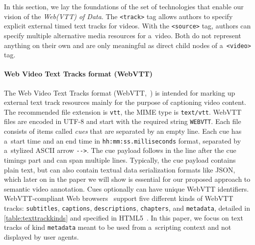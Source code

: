 \documentclass{sig-alternate}
\begin{document}
In this section, we lay the foundations of the set of technologies
that enable our vision of the \emph{Web(VTT) of Data}.
The \texttt{<track>} tag allows authors to specify explicit
external timed text tracks for videos.
With the \texttt{<source>} tag, authors can specify
multiple alternative media resources for a~video.
Both do not represent anything on their own
and are only meaningful as direct child nodes of a~\texttt{<video>} tag.

\paragraph{Web Video Text Tracks format (WebVTT)}

The Web Video Text Tracks format (WebVTT,~\cite{pfeiffer2013webvtt})
is intended for marking up external text track resources mainly
for the purpose of captioning video content.
The recommended file extension is \texttt{vtt},
the MIME type is \texttt{text/vtt}.
WebVTT files are encoded in UTF-8 and
start with the required string \texttt{WEBVTT}.
Each file consists of items called \emph{cues}
that are separated by an empty line.
Each cue has a~start time and an end time in
\texttt{hh:mm:ss.milliseconds} format,
separated by a~stylized ASCII arrow \texttt{-}\texttt{->}.
The cue payload follows in the line after the cue timings part
and can span multiple lines.
Typically, the cue payload contains plain text,
but can also contain textual data serialization formats like JSON,
which later on in the paper we will show is essential
for our proposed approach to semantic video annotation.
Cues optionally can have unique WebVTT identifiers.
WebVTT-compliant Web browsers~\cite{dutton2012trackelement}
support five different kinds of
WebVTT tracks: \texttt{subtitles}, \texttt{captions},
\texttt{descriptions}, \texttt{chapters}, and \texttt{metadata},
detailed in \autoref{table:texttrackkinds}
and specified in HTML5~\cite{berjon2013html5}.
In this paper, we focus on
text tracks of kind \texttt{metadata}
meant to be used from a~scripting context and
not displayed by user agents.
\end{document}
